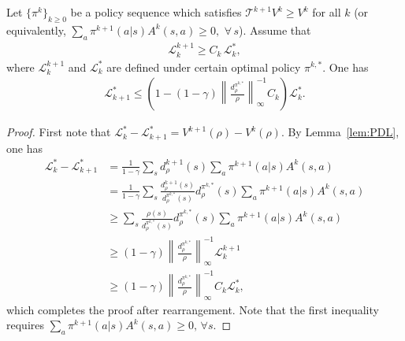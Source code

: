 \begin{theorem}\label{thm:linear-global}
Let $\{\pi^k\}_{k\geq 0}$ be a policy sequence which satisfies $\mathcal{T}^{k+1}V^k\geq V^k$ for all $k$ \textup{(}or equivalently, $\sum_a\pi^{k+1}(a|s)A^k(s,a)\geq 0,\,\,\forall\, s$\textup{)}.
    Assume that 
\begin{align*}
\mathcal{L}_k^{k+1} \geq C_k\,\mathcal{L}_k^*,
\end{align*}
where $\mathcal{L}_k^{k+1}$ and $\mathcal{L}_k^*$ are defined under certain optimal policy $\pi^{k,*}$.
One has
\begin{align*}
\mathcal{L}_{k+1}^* \leq \left(1-(1-\gamma)\left\|\frac{d_\rho^{\pi^{k,*}}}{\rho}\right\|_\infty^{-1}C_k\right)\mathcal{L}_k^*.
\end{align*}
\end{theorem}
\begin{proof}
First note that $\mathcal{L}_k^*-\mathcal{L}_{k+1}^*=V^{k+1}(\rho)-V^k(\rho)$. By Lemma~\ref{lem:PDL}, one has 
\begin{align*}
\mathcal{L}_k^*-\mathcal{L}_{k+1}^* & = \frac{1}{1-\gamma}\sum_s d_\rho^{k+1}(s)\sum_a\pi^{k+1}(a|s)A^k(s,a)\\
&=\frac{1}{1-\gamma}\sum_s\frac{d_\rho^{k+1}(s)}{d_\rho^{\pi^{k,*}}(s)}d_\rho^{\pi^{k,*}}(s)\sum_a\pi^{k+1}(a|s)A^k(s,a)\\
&\geq \sum_s\frac{\rho(s)}{d_\rho^{\pi^{k,*}}(s)}d_\rho^{\pi^{k,*}}(s)\sum_a\pi^{k+1}(a|s)A^k(s,a)\\
&\geq (1-\gamma)\left\|\frac{d_\rho^{\pi^{k,*}}}{\rho}\right\|_\infty^{-1}\mathcal{L}_k^{k+1}\\
&\geq (1-\gamma)\left\|\frac{d_\rho^{\pi^{k,*}}}{\rho}\right\|_\infty^{-1}C_k\mathcal{L}_k^*,
\end{align*}
which completes the proof after rearrangement. Note that the first inequality requires  $\sum_a\pi^{k+1}(a|s)A^k(s,a)\geq 0,\,\forall s$.
\end{proof}

